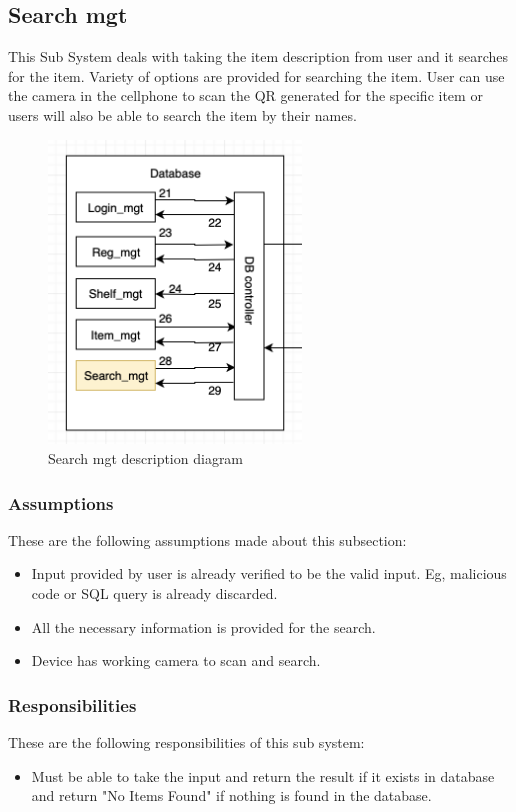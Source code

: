 \subsection{Search mgt}
This Sub System deals with taking the item description from user and it searches for the item. Variety of options are provided for searching the item. User can use the camera in the cellphone to scan the QR generated for the specific item or users will also be able to search the item by their names.

\begin{figure}[h!]
	\centering
 	\includegraphics[width=0.60\textwidth]{images/searchmgt}
 \caption{Search mgt description diagram}
\end{figure}

\subsubsection{Assumptions}
These are the following assumptions made about this subsection:
\begin{itemize}
    \item Input provided by user is already verified to be the valid input. Eg, malicious code or SQL query is already discarded.
    \item All the necessary information is provided for the search. 
    \item Device has working camera to scan and search. 
\end{itemize}

\subsubsection{Responsibilities}
These are the following responsibilities of this sub system:
\begin{itemize}
    \item Must be able to take the input and return the result if it exists in database and return "No Items Found" if nothing is found in the database.
\end{itemize}

